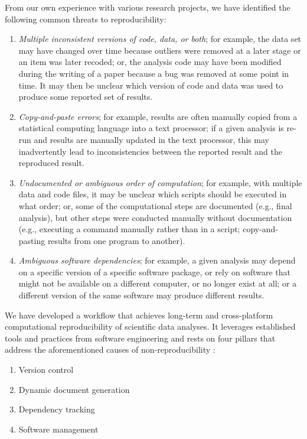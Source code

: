 \documentclass[psych,tutorial,submit,moreauthors,pdftex]{mdpi}
\providecommand{\tightlist}{%
  \setlength{\itemsep}{0pt}\setlength{\parskip}{4pt}}
\begin{document}
From our own experience with various research projects, we have
identified the following common threats to reproducibility:

\begin{enumerate}
\def\labelenumi{\arabic{enumi}.}
\tightlist
\item
  \emph{Multiple inconsistent versions of code, data, or both}; for
  example, the data set may have changed over time because outliers were
  removed at a later stage or an item was later recoded; or, the
  analysis code may have been modified during the writing of a paper
  because a bug was removed at some point in time. It may then be
  unclear which version of code and data was used to produce some
  reported set of results.
\item
  \emph{Copy-and-paste errors}; for example, results are often manually
  copied from a statistical computing language into a text processor; if
  a given analysis is re-run and results are manually updated in the
  text processor, this may inadvertently lead to inconsistencies between
  the reported result and the reproduced result.
\item
  \emph{Undocumented or ambiguous order of computation}; for example,
  with multiple data and code files, it may be unclear which scripts
  should be executed in what order; or, some of the computational steps
  are documented (e.g., final analysis), but other steps were conducted
  manually without documentation (e.g., executing a command manually
  rather than in a script; copy-and-pasting results from one program to
  another).
\item
  \emph{Ambiguous software dependencies}; for example, a given analysis
  may depend on a specific version of a specific software package, or
  rely on software that might not be available on a different computer,
  or no longer exist at all; or a different version of the same software
  may produce different results.
\end{enumerate}

We have developed a workflow that achieves long-term and cross-platform
computational reproducibility of scientific data analyses. It leverages
established tools and practices from software engineering and rests on
four pillars that address the aforementioned causes of
non-reproducibility \citep{Peikert2019}:

\begin{enumerate}
\def\labelenumi{\arabic{enumi}.}
\tightlist
\item
  Version control
\item
  Dynamic document generation
\item
  Dependency tracking
\item
  Software management
\end{enumerate}
\end{document}
